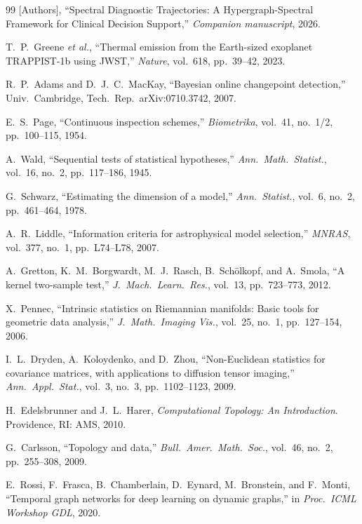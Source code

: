 \documentclass[conference]{IEEEtran}
\begin{document}
\begin{thebibliography}{99}
[Authors],
``Spectral Diagnostic Trajectories: A Hypergraph-Spectral Framework for
Clinical Decision Support,''
\textit{Companion manuscript}, 2026.

T.~P.~Greene \textit{et al.},
``Thermal emission from the Earth-sized exoplanet TRAPPIST-1b using JWST,''
\textit{Nature}, vol.~618, pp.~39--42, 2023.

R.~P.~Adams and D.~J.~C.~MacKay,
``Bayesian online changepoint detection,''
Univ.\ Cambridge, Tech.\ Rep.\ arXiv:0710.3742, 2007.

E.~S.~Page,
``Continuous inspection schemes,''
\textit{Biometrika}, vol.~41, no.~1/2, pp.~100--115, 1954.

A.~Wald,
``Sequential tests of statistical hypotheses,''
\textit{Ann.\ Math.\ Statist.}, vol.~16, no.~2, pp.~117--186, 1945.

G.~Schwarz,
``Estimating the dimension of a model,''
\textit{Ann.\ Statist.}, vol.~6, no.~2, pp.~461--464, 1978.

A.~R.~Liddle,
``Information criteria for astrophysical model selection,''
\textit{MNRAS}, vol.~377, no.~1, pp.~L74--L78, 2007.

A.~Gretton, K.~M.~Borgwardt, M.~J.~Rasch, B.~Sch\"{o}lkopf, and A.~Smola,
``A kernel two-sample test,''
\textit{J.\ Mach.\ Learn.\ Res.}, vol.~13, pp.~723--773, 2012.

X.~Pennec,
``Intrinsic statistics on Riemannian manifolds: Basic tools for geometric data analysis,''
\textit{J.\ Math.\ Imaging Vis.}, vol.~25, no.~1, pp.~127--154, 2006.

I.~L.~Dryden, A.~Koloydenko, and D.~Zhou,
``Non-Euclidean statistics for covariance matrices, with applications to diffusion tensor imaging,''
\textit{Ann.\ Appl.\ Stat.}, vol.~3, no.~3, pp.~1102--1123, 2009.

H.~Edelsbrunner and J.~L.~Harer,
\textit{Computational Topology: An Introduction}.
Providence, RI: AMS, 2010.

G.~Carlsson,
``Topology and data,''
\textit{Bull.\ Amer.\ Math.\ Soc.}, vol.~46, no.~2, pp.~255--308, 2009.

E.~Rossi, F.~Frasca, B.~Chamberlain, D.~Eynard, M.~Bronstein, and F.~Monti,
``Temporal graph networks for deep learning on dynamic graphs,''
in \textit{Proc.\ ICML Workshop GDL}, 2020.


\end{thebibliography}
\end{document}
